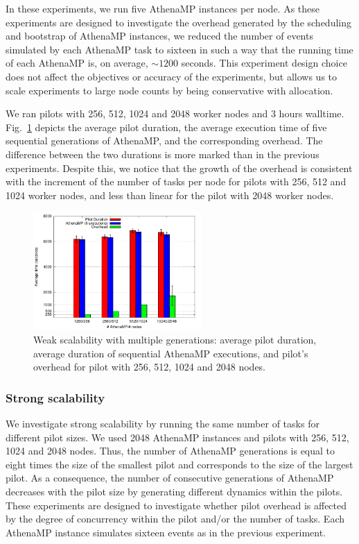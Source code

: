 In these experiments, we run five AthenaMP instances per node. As these
experiments are designed to investigate the overhead generated by the
scheduling and bootstrap of AthenaMP instances, we reduced the number of
events simulated by each AthenaMP task to sixteen in such a way that the
running time of each AthenaMP is, on average, $\sim 1200$ seconds. This
experiment design choice does not affect the objectives or accuracy of the
experiments, but allows us to scale experiments to large node counts by being
conservative with allocation.

We ran pilots with 256, 512, 1024 and 2048 worker nodes and 3
hours walltime. Fig.~\ref{fig:weakScal2a} depicts the average pilot duration,
the average execution time of five sequential generations of AthenaMP, and
the corresponding overhead. The difference between the two durations is more
marked than in the previous experiments. Despite this, we notice that the
growth of the overhead is consistent with the increment of the number of
tasks per node for pilots with 256, 512 and 1024 worker nodes, and less than
linear for the pilot with 2048 worker nodes.

\begin{figure}[!t]
        \includegraphics[height=4.5cm,width=\columnwidth]{./figures/NGE/weak2.pdf}
        \vspace{-0.3in}
    \caption{Weak scalability with multiple generations: average pilot
    duration, average duration of sequential AthenaMP executions, and
    pilot's overhead for pilot with 256, 512, 1024 and 2048 nodes.}
\label{fig:weakScal2a}
\end{figure}


\subsubsection{Strong scalability}

We investigate strong scalability by running the same number of tasks for
different pilot sizes. We used 2048 AthenaMP instances and pilots with 256,
512, 1024 and 2048 nodes. Thus, the number of AthenaMP generations is equal
to eight times the size of the smallest pilot and corresponds to the size of
the largest pilot. As a consequence, the number of consecutive generations of
AthenaMP decreases with the pilot size by generating different dynamics
within the pilots. These experiments are designed to investigate whether
pilot overhead is affected by the degree of concurrency within the pilot
and/or the number of tasks. Each AthenaMP instance simulates sixteen events
as in the previous experiment.


